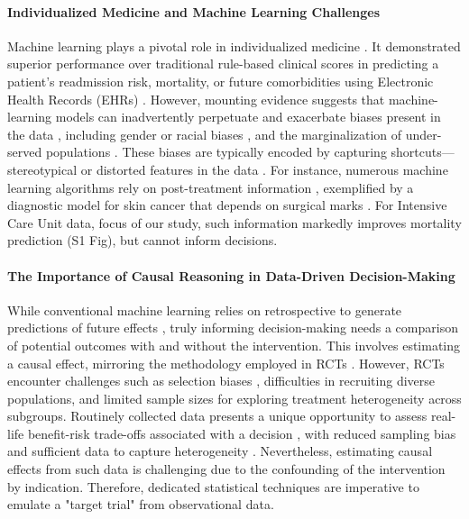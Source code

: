 \documentclass[10pt,letterpaper]{article}
\begin{document}
\paragraph{Individualized Medicine and Machine Learning Challenges}
Machine learning plays a pivotal role in individualized medicine  \cite{rajkomar2018scalable,liu2019comparison,li2020behrt,beaulieu2021machine,aggarwal2021diagnostic}. It
demonstrated superior performance over traditional rule-based clinical scores in predicting a patient's readmission risk, mortality, or future comorbidities using Electronic Health Records (EHRs) \cite{rajkomar2018scalable,liu2019comparison,li2020behrt,beaulieu2021machine,aggarwal2021diagnostic}.
However, mounting evidence suggests that machine-learning models can inadvertently perpetuate and exacerbate biases present in the data \cite{rajkomar2018ensuring}, including gender or racial biases \cite{singh2022generalizability,gichoya2022ai}, and the marginalization of under-served populations \cite{seyyed2021underdiagnosis}. These biases are typically encoded by capturing shortcuts—stereotypical or distorted features in the data \cite{geirhos2020shortcut,winkler2019association,degrave2021ai}.
%
For instance, numerous machine learning algorithms rely on post-treatment information \cite{badgeley2019deep,obermeyer2019dissecting,yuan2021temporal,wong2021external}, exemplified by a diagnostic model for skin cancer that depends on surgical marks \cite{winkler2019association}. For Intensive Care Unit data, focus of our study, such information markedly improves mortality prediction (S1 Fig), but cannot inform decisions.

\paragraph{The Importance of Causal Reasoning in Data-Driven Decision-Making} \cite{prosperi2020causal}
While conventional machine learning relies on retrospective to generate predictions of future effects \cite{plecko2022causal}, truly informing decision-making needs a comparison of potential outcomes with and without the intervention. This involves estimating a causal effect, mirroring the methodology employed in RCTs \cite{prosperi2020causal}. However, RCTs encounter challenges such as selection biases \cite{travers2007external,averitt2020translating}, difficulties in recruiting diverse populations, and limited sample sizes for exploring treatment heterogeneity across subgroups. Routinely collected data presents a unique opportunity to assess real-life benefit-risk trade-offs associated with a decision \cite{desai2021broadening}, with reduced sampling bias and sufficient data to capture heterogeneity \cite{rekkas2023standardized}. Nevertheless, estimating causal effects from such data is challenging due to the confounding of the intervention by indication. Therefore, dedicated statistical techniques are imperative to emulate a "target trial" \cite{hernan2016specifying} from observational data.
\end{document}
